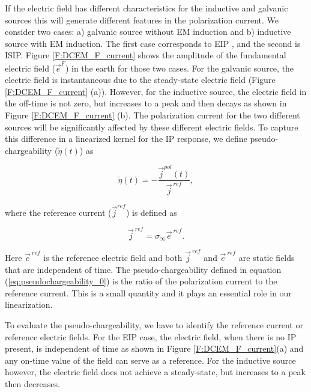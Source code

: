\documentclass[extra,mreferee]{gji}
\newcommand{\siginf}{\sigma_\infty}
\renewcommand {\j}  { {\vec j} }
\newcommand {\e}  { {\vec e} }
\newcommand{\peta}{\tilde{\eta}}
\newcommand{\eref}{\e^{\ ref}}
\begin{document}
If the electric field has different characteristics for the inductive and galvanic sources this will generate different features in the polarization current.  
We consider two cases: a) galvanic source without EM induction and b) inductive source with EM induction. The first case corresponds to EIP \cite[]{seigel1959}, and the second is ISIP.
Figure \ref{F:DCEM_F_current} shows the amplitude of the fundamental electric field ($\e^{F}$) in the earth for those two cases. 
For the galvanic source, the electric field is instantaneous due to the steady-state electric field (Figure \ref{F:DCEM_F_current} (a)). 
However, for the inductive source, the electric field in the off-time is not zero, but increases to a peak and then decays as shown in Figure \ref{F:DCEM_F_current} (b). 
The polarization current for the two different sources will be significantly affected by these different electric fields. 
To capture this difference in a linearized kernel for the IP response, we define pseudo-chargeability ($\peta(t)$) as 
\begin{linenomath*}
\begin{equation}
  \peta(t) = -\frac{\j^{pol}(t)}{\j^{\ ref}},
  \label{eq:pseudochargeability_0}
\end{equation}
\end{linenomath*}
where the reference current ($\j^{ref}$) is defined as 
\begin{linenomath*}
\begin{equation}
  \j^{\ ref} = \siginf \eref.
  \label{eq:reference_current}
\end{equation}
\end{linenomath*}
Here $\eref$ is the reference electric field and both $\j^{\ ref}$ and $\eref$ are static fields that are independent of time. 
The pseudo-chargeability defined in equation (\ref{eq:pseudochargeability_0})  is the ratio of  the polarization current to the reference current. This is a small quantity and it plays an essential role in our linearization. 

To evaluate the pseudo-chargeability, we have to identify the reference current or reference electric fields. For the EIP case, the electric field, when there is no IP present, is independent of time as shown in Figure \ref{F:DCEM_F_current}(a) and any on-time value of the field can serve as a reference. For the inductive source however, the electric field does not achieve a steady-state, but increases to a  peak then decreases. 

\end{document}
